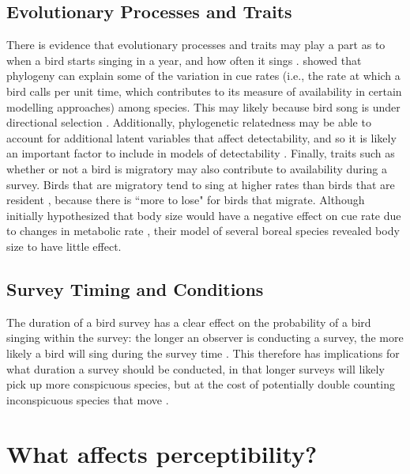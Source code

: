 \subsection{Evolutionary Processes and Traits}
\par There is evidence that evolutionary processes and traits may play a part as to when a bird starts singing in a year, and how often it sings \citep{thomas_two_1999}. 
\citet{solymos_phylogeny_2018} showed that phylogeny can explain some of the variation in cue rates (i.e., the rate at which a bird calls per unit time, which contributes to its measure of availability in certain modelling approaches) among species. 
This may likely because bird song is under directional selection \citep{solymos_phylogeny_2018, thomas_two_1999}.
Additionally, phylogenetic relatedness may be able to account for additional latent variables that affect detectability, and so it is likely an important factor to include in models of detectability \citep{frishkoff_phylogenetic_2017}.
Finally, traits such as whether or not a bird is migratory may also contribute to availability during a survey.
Birds that are migratory tend to sing at higher rates than birds that are resident \citep{gordo_geographic_2008}, because there is ``more to lose" for birds that migrate.
Although \citet{solymos_phylogeny_2018} initially hypothesized that body size would have a negative effect on cue rate due to changes in metabolic rate \citep{bennett_active_1987, read_evolution_1992}, their model of several boreal species revealed body size to have little effect.

\subsection{Survey Timing and Conditions}
\par The duration of a bird survey has a clear effect on the probability of a bird singing within the survey: the longer an observer is conducting a survey, the more likely a bird will sing during the survey time \citep{johnson_point_1995, diefenbach_incorporating_2007}.
This therefore has implications for what duration a survey should be conducted, in that longer surveys will likely pick up more conspicuous species, but at the cost of potentially double counting inconspicuous species that move \citep{solymos_revisiting_2016, matsuoka_reviving_2014, granholm_bias_1983}.

\section{What affects perceptibility?}

